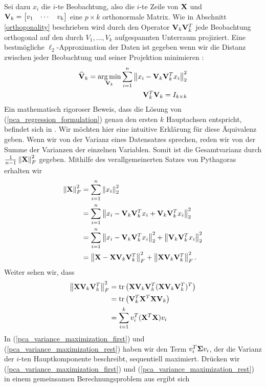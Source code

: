 Sei dazu $x_i$ die $i$-te Beobachtung, also die $i$-te Zeile von $\mathbf{X}$ und $\mathbf{V}_k = \begin{bmatrix} v_1 & \cdots & v_k \end{bmatrix}$ eine $p \times k$ orthonormale Matrix. Wie in Abschnitt \ref{orthogonality} beschrieben wird durch den Operator $\mathbf{V}_k \mathbf{V}_k^T$ jede Beobachtung orthogonal auf den durch $V_1, \ldots , V_k$ aufgespannten Unterraum projiziert. Eine bestmögliche $\ell_2$-Approximation der Daten ist gegeben wenn wir die Distanz zwischen jeder Beobachtung und seiner Projektion minimieren \cite{zou_sparsepca}:
\begin{align}
\label{pca_regression_formulation}
\begin{split}
\mathbf{\widehat{V}}_k = \operatorname*{arg\,min}_{\mathbf{V}_k} \sum_{i=1}^{n} \left\lVert x_i - \mathbf{V}_k \mathbf{V}_k^Tx_i \right\rVert_2^2\\
\mathbf{V}_k^T\mathbf{V}_k = I_{k \times k}
\end{split}
\end{align}
Ein mathematisch rigoroser Beweis, dass die Lösung von (\ref{pca_regression_formulation}) genau den ersten $k$ Hauptachsen entspricht, befindet sich in \cite{vidal}. Wir möchten hier eine intuitive Erklärung für diese Äquivalenz geben. Wenn wir von der Varianz eines Datensatzes sprechen, reden wir von der Summe der Varianzen der einzelnen Variablen. Somit ist die Gesamtvarianz durch $\frac{1}{n-1}\left\lVert \mathbf{X} \right\rVert_{F}^{2}$ gegeben. Mithilfe des verallgemeinerten Satzes von Pythagoras erhalten wir
\begin{align*}
\left\lVert \mathbf{X} \right\rVert_{F}^{2} & = \sum_{i=1}^{n} \left\lVert x_i \right\rVert_{2}^{2}\\
& = \sum_{i=1}^{n} \left\lVert x_i - \mathbf{V}_k \mathbf{V}_k^T x_i + \mathbf{V}_k \mathbf{V}_k^T x_i \right\rVert_{2}^{2}\\
& = \sum_{i=1}^{n} \left\lVert x_i - \mathbf{V}_k \mathbf{V}_k^T x_i \right\rVert_2^2 + \left\lVert \mathbf{V}_k \mathbf{V}_k^T x_i \right\rVert_{2}^{2}\\
& = \left\lVert \mathbf{X} - \mathbf{X} \mathbf{V}_k \mathbf{V}_k^T \right\rVert_{F}^{2} + \left\lVert \mathbf{X} \mathbf{V}_k \mathbf{V}_k^T \right\rVert_{F}^{2}.
\end{align*}
Weiter sehen wir, dass
\begin{align*}
\left\lVert \mathbf{X} \mathbf{V}_k \mathbf{V}_k^T \right\rVert_{F}^{2} & = \text{tr} \left( \mathbf{X} \mathbf{V}_k \mathbf{V}_k^T (\mathbf{X} \mathbf{V}_k \mathbf{V}_k^T)^T \right)\\
& = \text{tr} \left( \mathbf{V}_k^T \mathbf{X}^T \mathbf{X} \mathbf{V}_k \right)\\
& = \sum_{i=1}^{k} v_i^T (\mathbf{X}^T \mathbf{X}) v_i
\end{align*}
In (\ref{pca_variance_maximization_first}) und (\ref{pca_variance_maximization_rest}) haben wir den Term $v_i^T \mathbf{\Sigma} v_i$, der die Varianz der $i$-ten Hauptkomponente beschreibt, sequentiell maximiert. Drücken wir (\ref{pca_variance_maximization_first}) und (\ref{pca_variance_maximization_rest}) in einem gemeinsamen Berechnungsproblem aus ergibt sich

